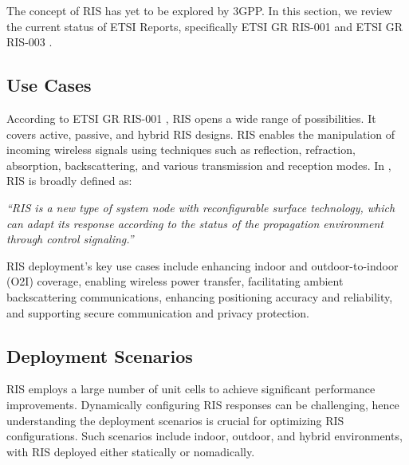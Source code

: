 \documentclass[lettersize,journal]{IEEEtran}
\begin{document}
The concept of RIS has yet to be explored by 3GPP. In this section, we review the current status of ETSI Reports, specifically ETSI GR RIS-001 \cite{ETSI-GR-RIS-001} and ETSI GR RIS-003 \cite{ETSI-GR-RIS-003}.

\subsection{Use Cases}

According to ETSI GR RIS-001 \cite{ETSI-GR-RIS-001}, RIS opens a wide range of possibilities. It covers active, passive, and hybrid RIS designs. RIS enables the manipulation of incoming wireless signals using techniques such as reflection, refraction, absorption, backscattering, and various transmission and reception modes. In \cite{ETSI-GR-RIS-001}, RIS is broadly defined as:
\vspace{0.2cm}

\noindent \emph{``RIS is a new type of system node with reconfigurable
surface technology, which can adapt its response according to
the status of the propagation environment through
control signaling.''}

\vspace{0.2cm}

RIS deployment's key use cases include enhancing indoor and outdoor-to-indoor (O2I) coverage, enabling wireless power transfer, facilitating ambient backscattering communications, enhancing positioning accuracy and reliability, and supporting secure communication and privacy protection.


\subsection{Deployment Scenarios}

RIS employs a large number of unit cells to achieve significant performance improvements. Dynamically configuring RIS responses can be challenging, hence understanding the deployment scenarios is crucial for optimizing RIS configurations. Such scenarios include indoor, outdoor, and hybrid environments, with RIS deployed either statically or nomadically.
\end{document}
